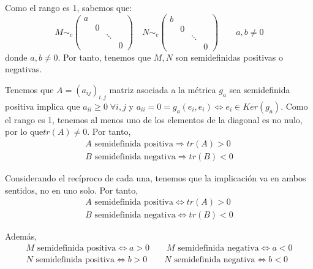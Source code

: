 \begin{ejercicio}
\begin{enumerate}
        Como el rango es 1, sabemos que:
        \begin{equation*}
            M \sim_c \left(\begin{array}{cccc}
                a \\
                &0 \\
                && \ddots \\
                &&&0
            \end{array} \right)
            \quad
            N \sim_c \left(\begin{array}{cccc}
                b \\
                &0 \\
                && \ddots \\
                &&&0
            \end{array} \right) \qquad a,b\neq 0
        \end{equation*}
        donde $a,b\neq 0$. Por tanto, tenemos que $M,N$ son semidefinidas positivas o negativas.

        Tenemos que $A=(a_{ij})_{i,j}$ matriz asociada a la métrica $g_a$ sea semidefinida positiva implica que $a_{ii}\geq 0\;\forall i,j$ y $a_{ii}=0=g_a(e_i,e_i)\Longleftrightarrow e_i\in Ker(g_a)$. Como el rango es 1, tenemos al menos uno de los elementos de la diagonal es no nulo, por lo que$tr(A)\neq 0$. Por tanto,
        \begin{gather*}
            A \text{ semidefinida positiva} \Longrightarrow tr(A)> 0 \\
            B \text{ semidefinida negativa} \Longrightarrow tr(B)< 0
        \end{gather*}

        Considerando el recíproco de cada una, tenemos que la implicación va en ambos sentidos, no en uno solo. Por tanto,
        \begin{gather*}
            A \text{ semidefinida positiva} \Longleftrightarrow tr(A)> 0 \\
            B \text{ semidefinida negativa} \Longleftrightarrow tr(B)< 0
        \end{gather*}

        Además,
        \begin{gather*}
            M \text{ semidefinida positiva} \Longleftrightarrow a>0 \qquad
            M \text{ semidefinida negativa} \Longleftrightarrow a<0 \\
            N \text{ semidefinida positiva} \Longleftrightarrow b>0 \qquad
            N \text{ semidefinida negativa} \Longleftrightarrow b<0 \\
        \end{gather*}
        

\end{enumerate}
\end{ejercicio}

